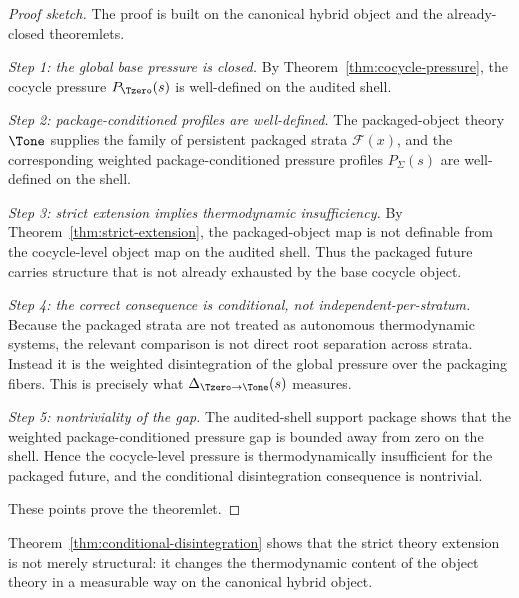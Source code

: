 \begin{proof}[Proof sketch]
The proof is built on the canonical hybrid object and the already-closed theoremlets.

\smallskip
\noindent\emph{Step 1: the global base pressure is closed.}
By Theorem~\ref{thm:cocycle-pressure}, the cocycle pressure \(P_{\Tzero}(s)\) is well-defined on the audited shell.

\smallskip
\noindent\emph{Step 2: package-conditioned profiles are well-defined.}
The packaged-object theory \(\Tone\) supplies the family of persistent packaged strata \(\mathcal{F}(x)\), and the corresponding weighted package-conditioned pressure profiles \(P_{\Sigma}(s)\) are well-defined on the shell.

\smallskip
\noindent\emph{Step 3: strict extension implies thermodynamic insufficiency.}
By Theorem~\ref{thm:strict-extension}, the packaged-object map is not definable from the cocycle-level object map on the audited shell. Thus the packaged future carries structure that is not already exhausted by the base cocycle object.

\smallskip
\noindent\emph{Step 4: the correct consequence is conditional, not independent-per-stratum.}
Because the packaged strata are not treated as autonomous thermodynamic systems, the relevant comparison is not direct root separation across strata. Instead it is the weighted disintegration of the global pressure over the packaging fibers. This is precisely what \(\Delta_{\Tzero\to \Tone}(s)\) measures.

\smallskip
\noindent\emph{Step 5: nontriviality of the gap.}
The audited-shell support package shows that the weighted package-conditioned pressure gap is bounded away from zero on the shell. Hence the cocycle-level pressure is thermodynamically insufficient for the packaged future, and the conditional disintegration consequence is nontrivial.

These points prove the theoremlet.
\end{proof}



Theorem~\ref{thm:conditional-disintegration} shows that the strict theory extension is not merely structural: it changes the thermodynamic content of the object theory in a measurable way on the canonical hybrid object.
